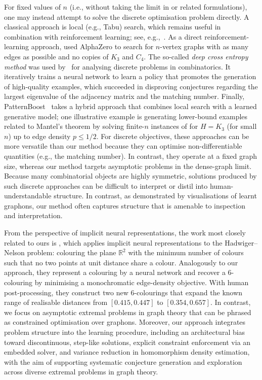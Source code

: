 \documentclass[11pt]{article}
\theoremstyle{plain}
\theoremstyle{definition}
\theoremstyle{remark}
\begin{document}
For fixed values of $n$ (i.e., without taking the limit in  or related formulations), one may instead attempt to solve the discrete optimisation problem directly. A classical approach is local (e.g., Tabu) search, which remains useful in combination with reinforcement learning; see, e.g.,~\citet{parczyk2025new,mehrabian2024finding}.
As a direct reinforcement-learning approach, \citet{mehrabian2024finding} used {\sc AlphaZero} to search for $n$-vertex graphs with as many edges as possible and no copies of $K_3$ and $C_4$.
The so-called \emph{deep cross entropy method} was used by~\citet{wagner2021constructions} for analysing discrete problems in combinatorics. It iteratively trains a neural network to learn a policy that promotes the generation of high-quality examples, which succeeded in disproving conjectures regarding the largest eigenvalue of the adjacency matrix and the matching number.
Finally, {\sc PatternBoost}~\citep{charton2024patternboost} takes a hybrid approach that combines local search with a learned generative model; one illustrative example is generating lower-bound examples related to Mantel's theorem by solving finite-$n$ instances of  for $H=K_3$ (for small $n$) up to edge density $p \le 1/2$.
For discrete objectives, these approaches can be more versatile than our method because they can optimise non-differentiable quantities (e.g., the matching number). In contrast, they operate at a fixed graph size, whereas our method targets asymptotic problems in the dense-graph limit.
Because many combinatorial objects are highly symmetric, solutions produced by such discrete approaches can be difficult to interpret or distil into human-understandable structure.
In contrast, as demonstrated by visualisations of learnt graphons, our method often captures structure that is amenable to inspection and interpretation.

From the perspective of implicit neural representations, the work most closely related to ours is \citet{mundinger2025neural}, which applies implicit neural representations to the Hadwiger--Nelson problem: colouring the plane $\mathbb{R}^2$ with the minimum number of colours such that no two points at unit distance share a colour. Analogously to our approach, they represent a colouring by a neural network and recover a 6-colouring by minimising a monochromatic edge-density objective. With human post-processing, they construct two new 6-colourings that expand the known range of realisable distances from $[0.415, 0.447]$ to $[0.354, 0.657]$. In contrast, we focus on asymptotic extremal problems in graph theory that can be phrased as constrained optimisation over graphons. Moreover, our approach integrates problem structure into the learning procedure, including an architectural bias toward discontinuous, step-like solutions, explicit constraint enforcement via an embedded solver, and variance reduction in homomorphism density estimation, with the aim of supporting systematic conjecture generation and exploration across diverse extremal problems in graph theory.
\end{document}

